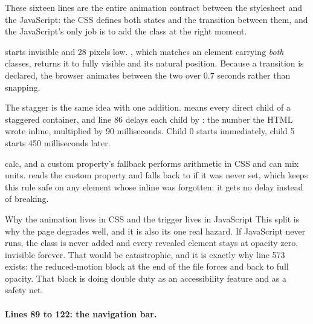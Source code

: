 These sixteen lines are the entire animation contract between the stylesheet and
the JavaScript: the CSS defines both states and the transition between them, and
the JavaScript's only job is to add the class  at the right moment.

 starts invisible and 28 pixels low. , which
matches an element carrying \emph{both} classes, returns it to fully visible and
its natural position. Because a transition is declared, the browser animates
between the two over 0.7 seconds rather than snapping.

The stagger is the same idea with one addition.  means every
direct child of a staggered container, and line 86 delays each child by
: the number the HTML wrote inline, multiplied by 90
milliseconds. Child 0 starts immediately, child 5 starts 450 milliseconds later.

\begin{jargon}{calc, and a custom property's fallback}
 performs arithmetic in CSS and can mix units. 
reads the custom property  and falls back to  if it was never
set, which keeps this rule safe on any element whose inline  was
forgotten: it gets no delay instead of breaking.
\end{jargon}

\begin{keyidea}{Why the animation lives in CSS and the trigger lives in JavaScript}
This split is why the page degrades well, and it is also its one real hazard. If
JavaScript never runs, the class  is never added and every revealed
element stays at opacity zero, invisible forever. That would be catastrophic, and
it is exactly why line 573 exists: the reduced-motion block at the end of the file
forces  and  back to full opacity. That block is
doing double duty as an accessibility feature and as a safety net.
\end{keyidea}

\paragraph{Lines 89 to 122: the navigation bar.}

